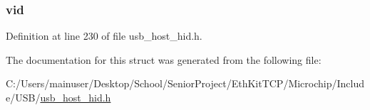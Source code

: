 \subsubsection[{vid}]{ vid}\label{struct___u_s_b___h_i_d___d_e_v_i_c_e___i_d_a9fcc011b7b6427b55322964f2d01781f}


Definition at line 230 of file usb\+\_\+host\+\_\+hid.\+h.



The documentation for this struct was generated from the following file\+:\begin{DoxyCompactItemize}
\item 
C\+:/\+Users/mainuser/\+Desktop/\+School/\+Senior\+Project/\+Eth\+Kit\+T\+C\+P/\+Microchip/\+Include/\+U\+S\+B/\hyperlink{usb__host__hid_8h}{usb\+\_\+host\+\_\+hid.\+h}\end{DoxyCompactItemize}
